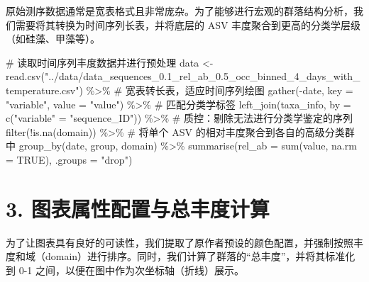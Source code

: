 \documentclass[
  letterpaper,
  DIV=11,
  numbers=noendperiod]{scrreprt}
\newenvironment{Shaded}{\begin{snugshade}}{\end{snugshade}}
\newcommand{\AttributeTok}[1]{\textcolor[rgb]{0.40,0.45,0.13}{#1}}
\newcommand{\CommentTok}[1]{\textcolor[rgb]{0.37,0.37,0.37}{#1}}
\newcommand{\ConstantTok}[1]{\textcolor[rgb]{0.56,0.35,0.01}{#1}}
\newcommand{\FunctionTok}[1]{\textcolor[rgb]{0.28,0.35,0.67}{#1}}
\newcommand{\NormalTok}[1]{\textcolor[rgb]{0.00,0.23,0.31}{#1}}
\newcommand{\OtherTok}[1]{\textcolor[rgb]{0.00,0.23,0.31}{#1}}
\newcommand{\SpecialCharTok}[1]{\textcolor[rgb]{0.37,0.37,0.37}{#1}}
\newcommand{\StringTok}[1]{\textcolor[rgb]{0.13,0.47,0.30}{#1}}
\begin{document}
原始测序数据通常是宽表格式且非常庞杂。为了能够进行宏观的群落结构分析，我们需要将其转换为时间序列长表，并将底层的
ASV 丰度聚合到更高的分类学层级（如硅藻、甲藻等）。

\begin{Shaded}
\begin{Highlighting}[]
\CommentTok{\# 读取时间序列丰度数据并进行预处理}
\NormalTok{data }\OtherTok{\textless{}{-}} \FunctionTok{read.csv}\NormalTok{(}\StringTok{"../data/data\_sequences\_0.1\_rel\_ab\_0.5\_occ\_binned\_4\_days\_with\_temperature.csv"}\NormalTok{) }\SpecialCharTok{\%\textgreater{}\%}
  \CommentTok{\# 宽表转长表，适应时间序列绘图}
  \FunctionTok{gather}\NormalTok{(}\SpecialCharTok{{-}}\NormalTok{date, }\AttributeTok{key =} \StringTok{"variable"}\NormalTok{, }\AttributeTok{value =} \StringTok{"value"}\NormalTok{) }\SpecialCharTok{\%\textgreater{}\%}
  \CommentTok{\# 匹配分类学标签}
  \FunctionTok{left\_join}\NormalTok{(taxa\_info, }\AttributeTok{by =} \FunctionTok{c}\NormalTok{(}\StringTok{"variable"} \OtherTok{=} \StringTok{"sequence\_ID"}\NormalTok{)) }\SpecialCharTok{\%\textgreater{}\%}
  \CommentTok{\# 质控：剔除无法进行分类学鉴定的序列}
  \FunctionTok{filter}\NormalTok{(}\SpecialCharTok{!}\FunctionTok{is.na}\NormalTok{(domain)) }\SpecialCharTok{\%\textgreater{}\%} 
  \CommentTok{\# 将单个 ASV 的相对丰度聚合到各自的高级分类群中}
  \FunctionTok{group\_by}\NormalTok{(date, group, domain) }\SpecialCharTok{\%\textgreater{}\%}
  \FunctionTok{summarise}\NormalTok{(}\AttributeTok{rel\_ab =} \FunctionTok{sum}\NormalTok{(value, }\AttributeTok{na.rm =} \ConstantTok{TRUE}\NormalTok{), }\AttributeTok{.groups =} \StringTok{"drop"}\NormalTok{)}
\end{Highlighting}
\end{Shaded}

\section{3.
图表属性配置与总丰度计算}\label{ux56feux8868ux5c5eux6027ux914dux7f6eux4e0eux603bux4e30ux5ea6ux8ba1ux7b97}

为了让图表具有良好的可读性，我们提取了原作者预设的颜色配置，并强制按照丰度和域（domain）进行排序。同时，我们计算了群落的``总丰度''，并将其标准化到
0-1 之间，以便在图中作为次坐标轴（折线）展示。
\end{document}
